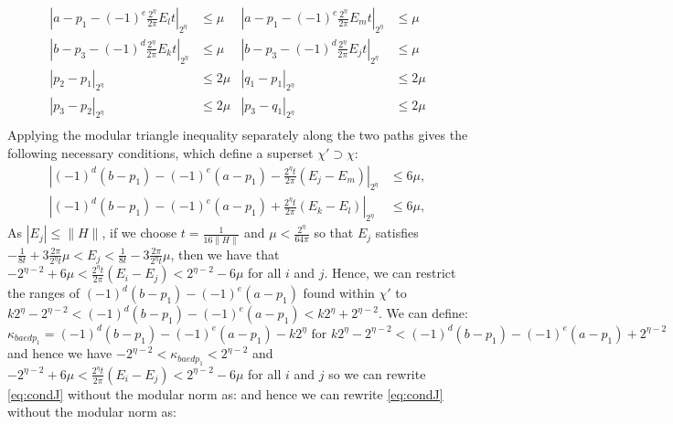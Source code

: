 \documentclass[aps,floatfix,10pt,amssymb,amsfont,amsmath,superscriptaddress,float,nofootinbib,longbibliography,nobalancelastpage,twocolumn]{revtex4-2}
\begin{document}
\begin{widetext}
\begin{equation}
\begin{aligned}
    |a-p_1-(-1)^e\frac{2^{\eta}}{2\pi}E_lt|_{2^{\eta}} &\leq \mu  &|a-p_1-(-1)^e\frac{2^{\eta}}{2\pi}E_mt|_{2^{\eta}} &\leq \mu\\
       |b-p_3-(-1)^{d}\frac{2^{\eta}}{2\pi}E_kt|_{2^{\eta}}& \leq \mu&|b-p_3-(-1)^{d}\frac{2^{\eta}}{2\pi}E_jt|_{2^{\eta}} &\leq \mu \\
    |p_2-p_1|_{2^{\eta}}&\leq 2\mu&  |q_1-p_1|_{2^{\eta}}&\leq 2\mu \\
    |p_3-p_2|_{2^{\eta}}&\leq 2\mu&  |p_3-q_1|_{2^{\eta}}&\leq 2\mu \\
\end{aligned}
\end{equation}
Applying the modular triangle inequality separately along the two paths gives the following necessary conditions, which define a superset $\chi'\supset\chi$:
\begin{equation}
\label{eq:condJ}
\begin{aligned}
    \left|(-1)^d(b-p_1) -(-1)^e(a-p_1)-\frac{2^{\eta}t}{2\pi}(E_j-E_m)\right|_{2^{\eta}}&\leq 6\mu,\\
    \left|(-1)^d(b-p_1) -(-1)^e(a-p_1)+\frac{2^{\eta}t}{2\pi}(E_k-E_l)\right|_{2^{\eta}}&\leq 6\mu,
\end{aligned}
\end{equation}
As $|E_j| \leq \|H\|$, if we choose $t = \frac{1}{16\|H\|}$ and $\mu < \frac{2^{\eta}}{64\pi}$ so that $E_j$ satisfies $-\frac{1}{8t} + 3\frac{2\pi}{2^{\eta}t}\mu < E_j < \frac{1}{8t} - 3\frac{2\pi}{2^{\eta}t}\mu$, then we have that $-2^{\eta-2}+6\mu < \frac{2^{\eta}t}{2\pi}(E_i -E_j) < 2^{\eta-2}-6\mu$ for all $i$ and $j$. Hence, we can restrict the ranges of $(-1)^d(b-p_1) -(-1)^e(a-p_1)$ found within $\chi'$ to $k2^{\eta} - 2^{\eta-2}< (-1)^d(b-p_1) -(-1)^e(a-p_1) < k2^{\eta} + 2^{\eta-2}$.
We can define:
\begin{equation}
    \kappa_{baedp_1} =(-1)^d(b-p_1) -(-1)^e(a-p_1)-k2^{\eta} \text{ for } k2^{\eta} - 2^{\eta-2}< (-1)^d(b-p_1) -(-1)^e(a-p_1) + 2^{\eta-2}
\end{equation}
and hence we have $-2^{\eta-2}<\kappa_{baedp_1} < 2^{\eta-2}$ and $-2^{\eta-2}+6\mu < \frac{2^{\eta}t}{2\pi}(E_i -E_j) < 2^{\eta-2}-6\mu$ for all $i$ and $j$ so we can rewrite \eqref{eq:condJ} without the modular norm as:
and hence we can rewrite \eqref{eq:condJ} without the modular norm as:
\begin{equation}
    \begin{aligned}

\end{aligned}
\end{equation}
\end{widetext}
\end{document}
